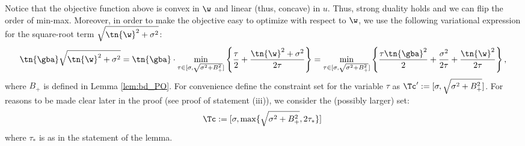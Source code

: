 Notice that the objective function above is convex in $\w$ and linear (thus, concave) in $u$. Thus, strong duality holds and we can flip the order of min-max. Moreover, in order to make the objective easy to optimize with respect to $\w$, we use the following variational expression for the square-root term $\sqrt{\tn{\w}^2+\sigma^2}$:
$$
\tn{\gba}\sqrt{\tn{\w}^2+\sigma^2} = \tn{\gba}\cdot\min_{\tau\in[\sigma,\sqrt{\sigma^2+B_+^2}]} \left\{ \frac{\tau}{2} + \frac{\tn{\w}^2+\sigma^2}{2\tau} \right\} = \min_{\tau\in[\sigma,\sqrt{\sigma^2+B_+^2}]} \left\{ \frac{\tau\tn{\gba}^2}{2} + \frac{\sigma^2}{2\tau} + \frac{\tn{\w}^2}{2\tau} \right\},
$$
where $B_+$ is defined in Lemma \ref{lem:bd_PO}. For convenience define the constraint set for the variable $\tau$ as $\Tc':=[\sigma,\sqrt{\sigma^2+B_+^2}]$. For reasons to be made clear later in the proof (see proof of statement (iii)), we consider the (possibly larger) set:
\[
\Tc:=[\sigma,\max\{\sqrt{\sigma^2+B_+^2},2\tau_*\}]\,
\]
where $\tau_*$ is as in the statement of the lemma.

